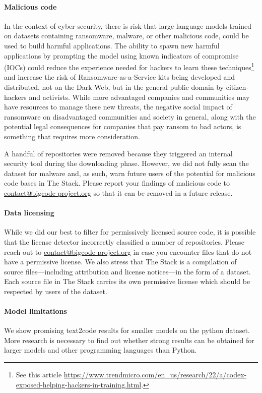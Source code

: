 \paragraph{Malicious code} In the context of cyber-security, there is risk that large language models trained on datasets containing ransomware, malware, or other malicious code, could be used to build harmful applications. The ability to spawn new harmful applications by prompting the model using known indicators of compromise (IOCs) could reduce the experience needed for hackers to learn these techniques\footnote{See this article \url{https://www.trendmicro.com/en_us/research/22/a/codex-exposed-helping-hackers-in-training.html}.} and increase the risk of Ransomware-as-a-Service kits being developed and distributed, not on the Dark Web, but in the general public domain by citizen-hackers and activists. While more advantaged companies and communities may have resources to manage these new threats, the negative social impact of ransomware on disadvantaged communities and society in general, along with the potential legal consequences for companies that pay ransom to bad actors, is something that requires more consideration.

A handful of repositories were removed because they triggered an internal security tool during the downloading phase. However, we did not fully scan the dataset for malware and, as such, warn future users of the potential for malicious code bases in The Stack. Please report your findings of malicious code to \url{contact@bigcode-project.org} so that it can be removed in a future release. 

\paragraph{Data licensing} While we did our best to filter for permissively licensed source code, it is possible that the license detector incorrectly classified a number of repositories. Please reach out to \url{contact@bigcode-project.org} in case you encounter files that do not have a permissive license. We also stress that The Stack is a compilation of source files---including attribution and license notices---in the form of a dataset. Each source file in The Stack carries its own permissive license which should be respected by users of the dataset.

\paragraph{Model limitations} We show promising text2code results for smaller models on the python dataset. More research is necessary to find out whether strong results can be obtained for larger models and other programming languages than Python. 


